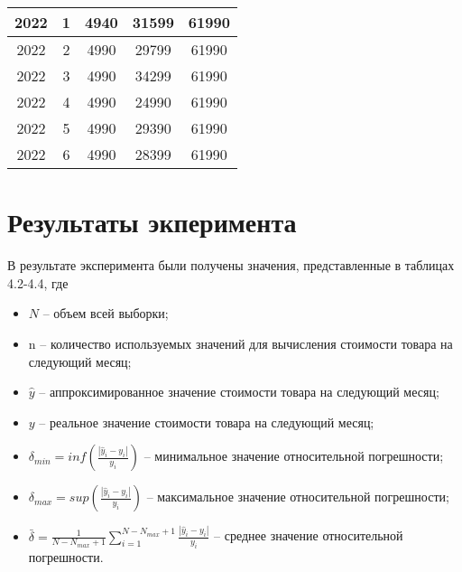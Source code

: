 \documentclass[a4paper]{bmstu}
\begin{document}
\begin{table}[H]
\begin{center}
\begin{tabular}{| c | c | c | c | c |}
			\hline
			
			2022 & 1 & 4940 & 31599 & 61990  \\
			
			\hline
			
			2022 & 2 & 4990 & 29799 & 61990  \\
			
			\hline
			
			2022 & 3 & 4990 & 34299 & 61990  \\
			
			\hline
			
			2022 & 4 & 4990 & 24990 & 61990  \\
			
			\hline
			
			2022 & 5 & 4990 & 29390 & 61990  \\
			
			\hline
			
			2022 & 6 & 4990 & 28399 & 61990  \\
			
			\hline
		\end{tabular}
	\end{center}
\end{table}

\section{Результаты экперимента}

В результате эксперимента были получены значения, представленные в таблицах 4.2-4.4, где

\begin{itemize}
	\item $N$ -- объем всей выборки;
	\item n -- количество используемых значений для вычисления стоимости товара на следующий месяц;
	\item $\hat{y}$ -- аппроксимированное значение стоимости товара на следующий месяц;
	\item $y$ -- реальное значение стоимости товара на следующий месяц;
	\item $\delta_{min} = inf(\frac{|\hat{y}_i - y_i|}{y_i})$ -- минимальное значение относительной погрешности;
	\item $\delta_{max} = sup(\frac{|\hat{y}_i - y_i|}{y_i})$ -- максимальное значение относительной погрешности;
	\item $\bar{\delta} = \frac{1}{N - N_{max} + 1} \displaystyle\sum_{i = 1}^{N - N_{max} + 1} \frac{|\hat{y}_i - y_i|}{y_i}$ -- среднее значение относительной погрешности.
\end{itemize}
\end{document}
